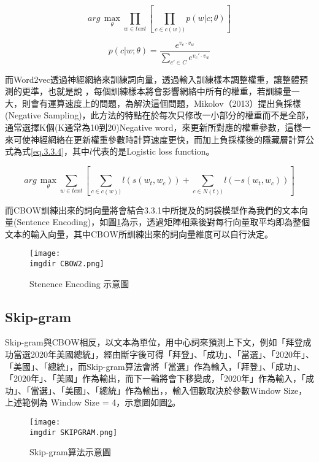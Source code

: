 \begin{equation}\label{eq.3.3.2}
	arg\,\max\limits_{\theta}\prod_{w\in text}\left [ \prod_{c\in c(w))} p(w|c;\theta) \right ]
\end{equation}

\begin{equation}\label{eq.3.3.3}
	p(c|w;\theta) = \frac{e^{v_c\cdot{v_w} }}{\sum_{{c}'\in C} e^{v_{c}'\cdot{v_w}}}
\end{equation}
	
	而Word2vec透過神經網絡來訓練詞向量，透過輸入訓練樣本調整權重，讓整體預測的更準，也就是說 ，每個訓練樣本將會影響網絡中所有的權重，若訓練量一大，則會有運算速度上的問題，為解決這個問題，Mikolov（2013）提出負採樣(Negative Sampling)，此方法的特點在於每次只修改一小部分的權重而不是全部，通常選擇K個(K通常為10到20)Negative word，來更新所對應的權重參數，這樣一來可使神經網絡在更新權重參數時計算速度更快，而加上負採樣後的隱藏層計算公式為式\ref{eq.3.3.4}，其中$l$代表的是Logistic loss function。
	
\begin{equation}\label{eq.3.3.4}
arg\,\max\limits_{\theta}\sum_{w\in text}\left [ \sum_{c\in c(w))} l(s(w_t,w_c))+ \sum_{c\in N(t))} l(-s(w_t,w_c)) \right ]
\end{equation}

	而CBOW訓練出來的詞向量將會結合3.3.1中所提及的詞袋模型作為我們的文本向量(Sentence Encoding)，如圖\ref{grap.3.3.3}為示，透過矩陣相乘後對每行向量取平均即為整個文本的輸入向量，其中CBOW所訓練出來的詞向量維度可以自行決定。
	
\begin{figure}[H]
    \centering
        \texttt{[image: \\imgdir CBOW2.png]}
    \caption{Stenence Encoding 示意圖}
    \label{grap.3.3.3}
\end{figure}

\subsection{Skip-gram}
	Skip-gram與CBOW相反，以文本為單位，用中心詞來預測上下文，例如「拜登成功當選2020年美國總統」，經由斷字後可得「拜登」、「成功」、「當選」、「2020年」、「美國」、「總統」，而Skip-gram算法會將「當選」作為輸入，「拜登」、「成功」、「2020年」、「美國」作為輸出，而下一輪將會下移變成，「2020年」作為輸入，「成功」、「當選」、「美國」、「總統」作為輸出，，輸入個數取決於參數Window Size，上述範例為 Window Size = 4，示意圖如圖\ref{grap.3.4.1}。

\begin{figure}[H]
    \centering
        \texttt{[image: \\imgdir SKIPGRAM.png]}
    \caption{Skip-gram算法示意圖}
    \label{grap.3.4.1}
\end{figure}

